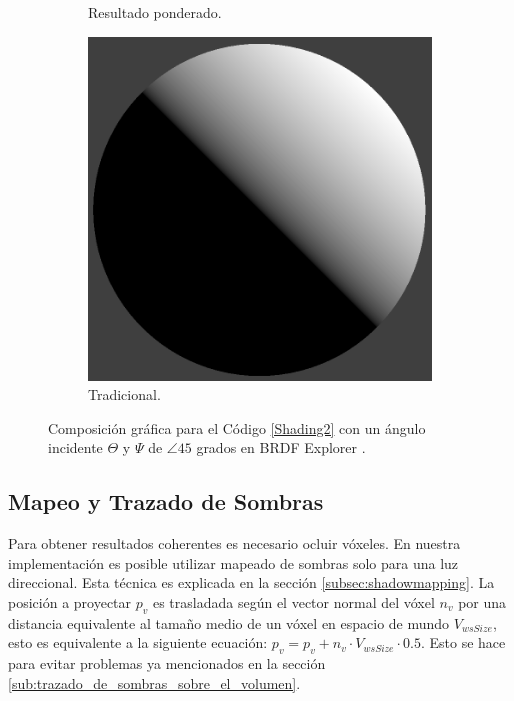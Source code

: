 \begin{figure}[H]
\begin{subfigure}[t]{0.2\textwidth}
		\caption*{Resultado ponderado.}
	\end{subfigure}%
	\begin{subfigure}[t]{0.2\textwidth}
		\centering
		\captionsetup{justification=centering}
		\includegraphics[width=\linewidth]{media/nDotLT.png}
		\caption*{Tradicional.}
	\end{subfigure}%
	\caption{Composición gráfica para el Código \ref{Shading2} con un ángulo incidente $\Theta$ y $\Psi$ de $\angle 45$ grados en BRDF Explorer \cite{brdf_explorer}.}
	\label{fig:compositve_vshading}
\end{figure}

\subsection{Mapeo y Trazado de Sombras}

Para obtener resultados coherentes es necesario ocluir vóxeles. En nuestra implementación es posible utilizar mapeado de sombras solo para una luz direccional. Esta técnica es explicada en la sección \ref{subsec:shadowmapping}. La posición a proyectar $p_{v}$ es trasladada según el vector normal del vóxel $n_{v}$ por una distancia equivalente al tamaño medio de un vóxel en espacio de mundo $V_{wsSize}$, esto es equivalente a la siguiente ecuación: $p_{v} = p_{v} + n_{v}\cdot V_{wsSize} \cdot 0.5$. Esto se hace para evitar problemas ya mencionados en la sección \ref{sub:trazado_de_sombras_sobre_el_volumen}.

